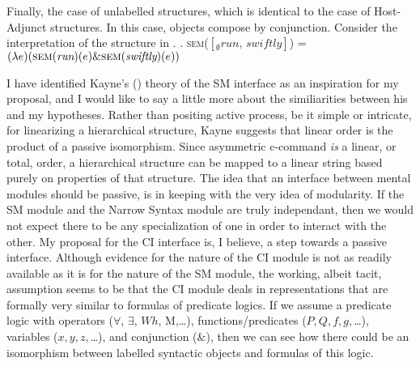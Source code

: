 \documentclass[MilwayThesis]{subfiles}
\begin{document}
Finally, the case of unlabelled structures, which is identical to the case of Host-Adjunct structures.
In this case, objects compose by conjunction.
Consider the interpretation of the structure in \Next.
\ex. \textsc{sem}($\left[_\emptyset \textit{run, swiftly} \right]$) =  $(\lambda e)(\textsc{sem}(\textit{run})(e) \& \textsc{sem}(\textit{swiftly})(e))$


I have identified Kayne's (\citeyear{kayne1994antisymmetry}) theory of the SM interface as an inspiration for my proposal, and I would like to say a little more about the similiarities between his and my hypotheses.
Rather than positing active process, be it simple or intricate, for linearizing a hierarchical structure, Kayne suggests that linear order is the product of a passive isomorphism.
Since asymmetric c-command \textit{is} a linear, or total, order, a hierarchical structure can be mapped to a linear string based purely on properties of that structure.
The idea that an interface between mental modules should be passive, is in keeping with the very idea of modularity.
If the SM module and the Narrow Syntax module are truly independant, then we would not expect there to be any specialization of one in order to interact with the other.
My proposal for the CI interface is, I believe, a step towards a passive interface.
Although evidence for the nature of the CI module is not as readily available as it is for the nature of the SM module, the working, albeit tacit, assumption seems to be that the CI module deals in representations that are formally very similar to formulas of predicate logics.
If we assume a predicate logic with operators ($\forall$, $\exists$, $Wh$, M,\ldots), functions/predicates ($P, Q, f, g,$\ldots), variables ($x, y, z,$\ldots), and conjunction ($\&$), then we can see how there could be an isomorphism between labelled syntactic objects and formulas of this logic.
\end{document}
